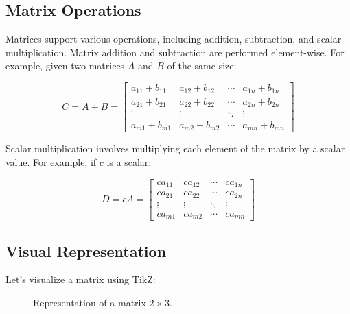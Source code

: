 \documentclass[a4paper,12pt]{book}
\newcounter{example}
\begin{document}
\subsection{Matrix Operations}

Matrices support various operations, including addition, subtraction, and scalar multiplication. Matrix addition and subtraction are performed element-wise. For example, given two matrices $A$ and $B$ of the same size:

\[
C = A + B = \begin{bmatrix}
a_{11}+b_{11} & a_{12}+b_{12} & \cdots & a_{1n}+b_{1n} \\
a_{21}+b_{21} & a_{22}+b_{22} & \cdots & a_{2n}+b_{2n} \\
\vdots & \vdots & \ddots & \vdots \\
a_{m1}+b_{m1} & a_{m2}+b_{m2} & \cdots & a_{mn}+b_{mn}
\end{bmatrix}
\]

Scalar multiplication involves multiplying each element of the matrix by a scalar value. For example, if $c$ is a scalar:

\[
D = cA = \begin{bmatrix}
ca_{11} & ca_{12} & \cdots & ca_{1n} \\
ca_{21} & ca_{22} & \cdots & ca_{2n} \\
\vdots & \vdots & \ddots & \vdots \\
ca_{m1} & ca_{m2} & \cdots & ca_{mn}
\end{bmatrix}
\]

\subsection{Visual Representation}

Let's visualize a matrix using TikZ:

\begin{figure}[H]
    \centering
    \caption{Representation of a matrix $2 \times 3$.}
    \label{fig:matrix_representation}
\end{figure}
\end{document}

